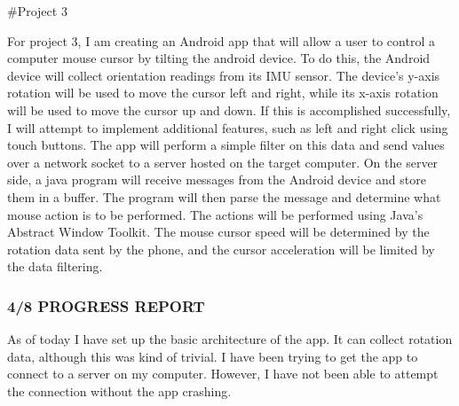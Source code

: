 \#\+Project 3

For project 3, I am creating an Android app that will allow a user to control a computer mouse cursor by tilting the android device. To do this, the Android device will collect orientation readings from its I\+MU sensor. The device’s y-\/axis rotation will be used to move the cursor left and right, while its x-\/axis rotation will be used to move the cursor up and down. If this is accomplished successfully, I will attempt to implement additional features, such as left and right click using touch buttons. The app will perform a simple filter on this data and send values over a network socket to a server hosted on the target computer. On the server side, a java program will receive messages from the Android device and store them in a buffer. The program will then parse the message and determine what mouse action is to be performed. The actions will be performed using Java’s Abstract Window Toolkit. The mouse cursor speed will be determined by the rotation data sent by the phone, and the cursor acceleration will be limited by the data filtering.

\subsubsection*{4/8 P\+R\+O\+G\+R\+E\+SS R\+E\+P\+O\+RT}

As of today I have set up the basic architecture of the app. It can collect rotation data, although this was kind of trivial. I have been trying to get the app to connect to a server on my computer. However, I have not been able to attempt the connection without the app crashing. 